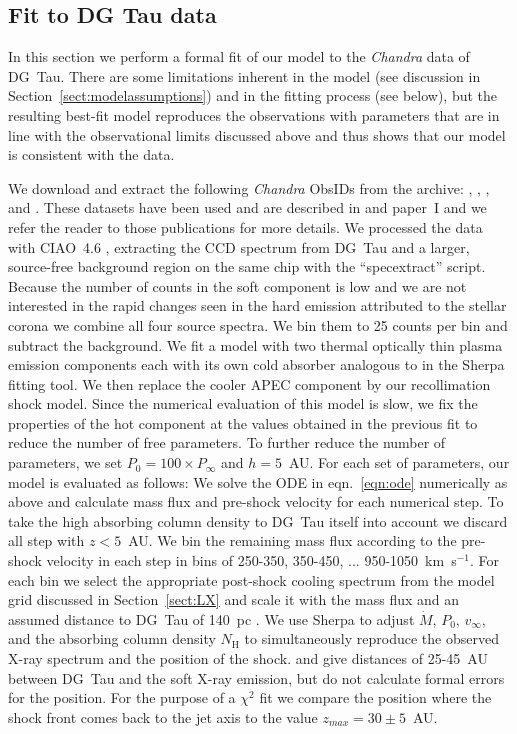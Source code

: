 \subsection{Fit to DG Tau data}
In this section we perform a formal fit of our model to the \emph{Chandra} data of DG~Tau. There are some limitations inherent in the model (see discussion in Section~\ref{sect:modelassumptions}) and in the fitting process (see below), but the resulting best-fit model reproduces the observations with parameters that are in line with the observational limits discussed above and thus shows that our model is consistent with the data.

We download and extract the following \emph{Chandra} ObsIDs from the archive: , , , and . These datasets have been used and are described in \citet{2008A&A...478..797G,2008A&A...488L..13S} and paper~I and we refer the reader to those publications for more details. We processed the data with CIAO~4.6 \citep{2006SPIE.6270E..60F}, extracting the CCD spectrum from DG~Tau and a larger, source-free background region on the same chip with the ``specextract'' script. Because the number of counts in the soft component is low and we are not interested in the rapid changes seen in the hard emission attributed to the stellar corona \citep{2008A&A...478..797G} we combine all four source spectra. We bin them to 25 counts per bin and subtract the background. We fit a model with two thermal optically thin plasma emission components \citep[APEC][]{2012ApJ...756..128F} each with its own cold absorber analogous to \citep{2008A&A...478..797G} in the Sherpa fitting tool. We then replace the cooler APEC component by our recollimation shock model. Since the numerical evaluation of this model is slow, we fix the properties of the hot component at the values obtained in the previous fit to reduce the number of free parameters. To further reduce the number of parameters, we set $P_0 = 100\times P_\infty$ and $h=5$~AU. For each set of parameters, our model is evaluated as follows: We solve the ODE in eqn.~\ref{eqn:ode} numerically as above and calculate mass flux and pre-shock velocity for each numerical step. To take the high absorbing column density to DG~Tau itself into account we discard all step with $z<5$~AU. We bin the remaining mass flux according to the pre-shock velocity in each step in bins of 250-350, 350-450, ... 950-1050~km~s$^{-1}$. For each bin we select the appropriate post-shock cooling spectrum from the model grid discussed in Section~\ref{sect:LX} and scale it with the mass flux and an assumed distance to DG~Tau of 140~pc \citep{1994AJ....108.1872K}. We use Sherpa to adjust $\dot M$, $P_0$, $v_\infty$, and the absorbing column density $N_\textrm{H}$ to simultaneously reproduce the observed X-ray spectrum and the position of the shock. \citet{2008A&A...488L..13S} and \citet{2011ASPC..448..617G} give distances of 25-45~AU between DG~Tau and the soft X-ray emission, but do not calculate formal errors for the position. For the purpose of a $\chi^2$ fit we compare the position where the shock front comes back to the jet axis to the value $z_{max} = 30\pm5$~AU.

